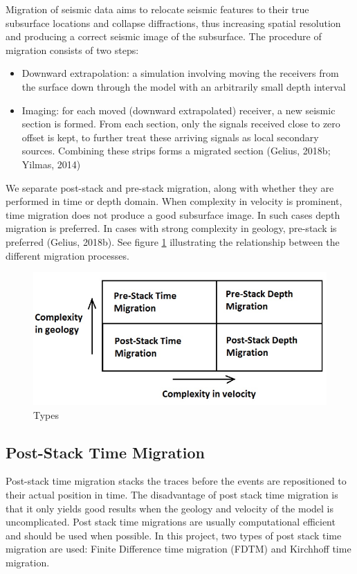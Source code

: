 \documentclass[10pt,a4paper]{article}
\begin{document}
\noindent Migration of seismic data aims to relocate seismic features to their true subsurface locations and collapse diffractions, thus increasing spatial resolution and producing a correct seismic image of the subsurface. The procedure of migration consists of two steps:

\begin{itemize}
    \item Downward extrapolation: a simulation involving moving the receivers from the surface down through the model with an arbitrarily small depth interval
    \item Imaging: for each moved (downward extrapolated) receiver, a new seismic section is formed. From each section, only the signals received close to zero offset is kept, to further treat these arriving signals as local secondary sources. Combining these strips forms a migrated section (Gelius, 2018b; Yilmas, 2014)
\end{itemize}

\noindent We separate post-stack and pre-stack migration, along with whether they are performed in time or depth domain. When complexity in velocity is prominent, time migration does not produce a good subsurface image. In such cases depth migration is preferred. In cases with strong complexity in geology, pre-stack is preferred (Gelius, 2018b). See figure \ref{Types} illustrating the relationship between the different migration processes.

\begin{figure}[H]
\includegraphics[width=\textwidth]{types_of_migration.jpg}
\caption{Types}
\label{Types}
\end{figure}

\subsection{Post-Stack Time Migration}

\noindent Post-stack time migration stacks the traces before the events are repositioned to their actual position in time. The disadvantage of post stack time migration is that it only yields good results when the geology and velocity of the model is uncomplicated. Post stack time migrations are usually computational efficient and should be used when possible. In this project, two types of post stack time migration are used: Finite Difference time migration (FDTM) and Kirchhoff time migration.
\end{document}
